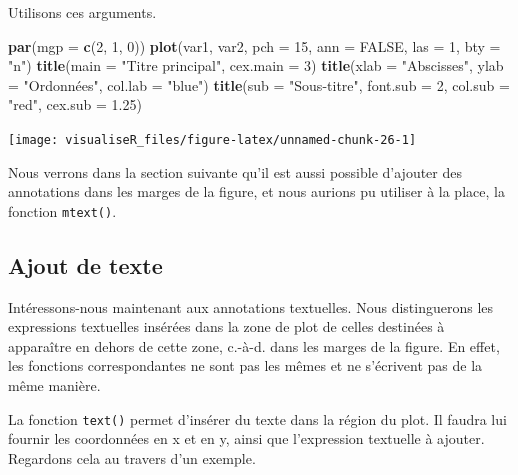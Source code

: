 \documentclass[]{article}
\newenvironment{Shaded}{\begin{snugshade}}{\end{snugshade}}
\newcommand{\DataTypeTok}[1]{\textcolor[rgb]{0.13,0.29,0.53}{#1}}
\newcommand{\DecValTok}[1]{\textcolor[rgb]{0.00,0.00,0.81}{#1}}
\newcommand{\FloatTok}[1]{\textcolor[rgb]{0.00,0.00,0.81}{#1}}
\newcommand{\KeywordTok}[1]{\textcolor[rgb]{0.13,0.29,0.53}{\textbf{#1}}}
\newcommand{\NormalTok}[1]{#1}
\newcommand{\OtherTok}[1]{\textcolor[rgb]{0.56,0.35,0.01}{#1}}
\newcommand{\StringTok}[1]{\textcolor[rgb]{0.31,0.60,0.02}{#1}}
\begin{document}
Utilisons ces arguments.

\begin{Shaded}
\begin{Highlighting}[]
\KeywordTok{par}\NormalTok{(}\DataTypeTok{mgp =} \KeywordTok{c}\NormalTok{(}\DecValTok{2}\NormalTok{, }\DecValTok{1}\NormalTok{, }\DecValTok{0}\NormalTok{))}
\KeywordTok{plot}\NormalTok{(var1, var2, }\DataTypeTok{pch =} \DecValTok{15}\NormalTok{, }\DataTypeTok{ann =} \OtherTok{FALSE}\NormalTok{, }\DataTypeTok{las =} \DecValTok{1}\NormalTok{, }\DataTypeTok{bty =} \StringTok{"n"}\NormalTok{)}
\KeywordTok{title}\NormalTok{(}\DataTypeTok{main =} \StringTok{"Titre principal"}\NormalTok{, }\DataTypeTok{cex.main =} \DecValTok{3}\NormalTok{)}
\KeywordTok{title}\NormalTok{(}\DataTypeTok{xlab =} \StringTok{"Abscisses"}\NormalTok{, }\DataTypeTok{ylab =} \StringTok{"Ordonnées"}\NormalTok{, }\DataTypeTok{col.lab =} \StringTok{"blue"}\NormalTok{)}
\KeywordTok{title}\NormalTok{(}\DataTypeTok{sub =} \StringTok{"Sous-titre"}\NormalTok{, }\DataTypeTok{font.sub =} \DecValTok{2}\NormalTok{, }\DataTypeTok{col.sub =} \StringTok{"red"}\NormalTok{, }\DataTypeTok{cex.sub =} \FloatTok{1.25}\NormalTok{)}
\end{Highlighting}
\end{Shaded}

\begin{center}\texttt{[image: visualiseR\_files/figure-latex/unnamed-chunk-26-1]} \end{center}

Nous verrons dans la section suivante qu'il est aussi possible d'ajouter des annotations dans les marges de la figure, et nous aurions pu utiliser à la place, la fonction \texttt{mtext()}.

\hypertarget{ajout-de-texte}{%
\subsection{Ajout de texte}\label{ajout-de-texte}}

Intéressons-nous maintenant aux annotations textuelles. Nous distinguerons les expressions textuelles insérées dans la zone de plot de celles destinées à apparaître en dehors de cette zone, c.-à-d. dans les marges de la figure. En effet, les fonctions correspondantes ne sont pas les mêmes et ne s'écrivent pas de la même manière.

La fonction \texttt{text()} permet d'insérer du texte dans la région du plot. Il faudra lui fournir les coordonnées en x et en y, ainsi que l'expression textuelle à ajouter. Regardons cela au travers d'un exemple.
\end{document}
